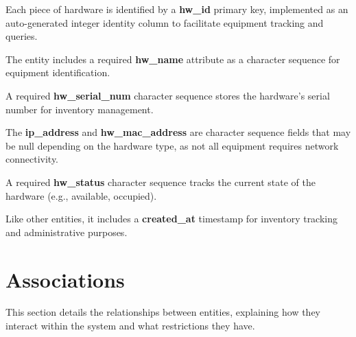 \documentclass[a4paper,twoside,11pt]{article}
\begin{document}
Each piece of hardware is identified by a \textbf{hw\_id} primary key, implemented as an auto-generated integer identity column to facilitate equipment tracking and queries.

The entity includes a required \textbf{hw\_name} attribute as a character sequence for equipment identification.

A required \textbf{hw\_serial\_num} character sequence stores the hardware's serial number for inventory management.

The \textbf{ip\_address} and \textbf{hw\_mac\_address} are character sequence fields that may be null depending on the hardware type, as not all equipment requires network connectivity.

A required \textbf{hw\_status} character sequence tracks the current state of the hardware (e.g., available, occupied).

Like other entities, it includes a \textbf{created\_at} timestamp for inventory tracking and administrative purposes.

\section{Associations}
This section details the relationships between entities, explaining how they interact within the system and what restrictions they have.
\end{document}
